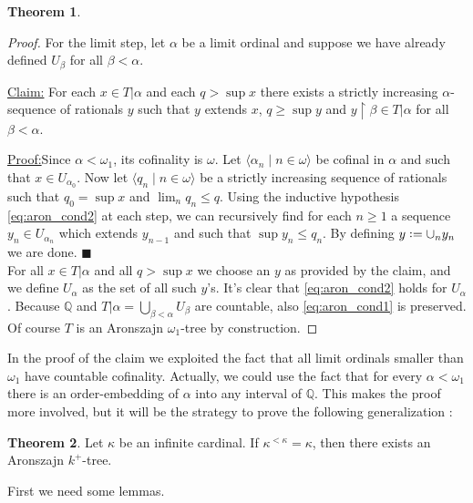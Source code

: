 \documentclass[12pt,a4paper]{report}
\theoremstyle{definition}
\newtheorem{theorem}{Theorem}[chapter] %
\theoremstyle{num.custom-title}
\newenvironment{claim}[1]{\par\noindent\underline{Claim#1:}\space}{} %
\newenvironment{claimproof}[1]{\par\noindent\underline{Proof:}\space#1}{\leavevmode\unskip\penalty9999 \hbox{}\nobreak\hfill\quad\hbox{$\blacksquare$}} %
\DeclareMathOperator{\restr}{\upharpoonright}
\newcommand{\Q}{\mathbb{Q}}
\newcommand*{\defeq}{\mathrel{\rlap{%
                     \raisebox{0.3ex}{$\cdot$}}%
                     \raisebox{-0.3ex}{$\cdot$}}%
                     =}
\begin{document}
\begin{theorem}
\begin{proof}
For the limit step, let $\alpha$ be a limit ordinal and suppose we have already defined $U_\beta$ for all $\beta<\alpha$.
\begin{claim}{}
For each $x \in T|\alpha$ and each $q > \sup x$ there exists a strictly increasing $\alpha$-sequence of rationals $y$ such that $y$ extends $x$, $q \geq \sup y$ and $y \restr \beta \in T|\alpha$ for all $\beta<\alpha$.
\begin{claimproof}
Since $\alpha < \omega_1$, its cofinality is $\omega$. Let $\langle \alpha_n \mid n \in \omega \rangle$ be cofinal in $\alpha$ and such that $x \in U_{\alpha_0}$. Now let $\langle q_n \mid n \in \omega \rangle$ be a strictly increasing sequence of rationals such that $q_0 = \sup x$ and $\lim_n q_n \leq q$. Using the inductive hypothesis \eqref{eq:aron_cond2} at each step, we can recursively find for each $n \geq 1$ a sequence $y_n \in U_{\alpha_n}$ which extends $y_{n-1}$ and such that $\sup y_n \leq q_n$. By defining $y \defeq \cup_n y_n$ we are done.
\end{claimproof}
\end{claim}\\[6pt]
For all $x \in T|\alpha$ and all $q > \sup x$ we choose an $y$ as provided by the claim, and we define $U_\alpha$ as the set of all such $y$'s. It's clear that \eqref{eq:aron_cond2} holds for $U_\alpha$. Because $\Q$ and $T|\alpha = \bigcup_{\beta < \alpha} U_\beta$ are countable, also \eqref{eq:aron_cond1} is preserved.\\
Of course $T$ is an Aronszajn $\omega_1$-tree by construction.
\end{proof}
\end{theorem}

In the proof of the claim we exploited the fact that all limit ordinals smaller than $\omega_1$ have countable cofinality. Actually, we could use the fact that for every $\alpha < \omega_1$ there is an order-embedding of $\alpha$ into any interval of $\Q$. This makes the proof more involved, but it will be the strategy to prove the following generalization \cite{Spe1951}:

\begin{theorem}\label{thm-aronszajn_k+_tree}
Let $\kappa$ be an infinite cardinal. If $\kappa^{<\kappa}=\kappa$, then there exists an Aronszajn $k^+$-tree.
\end{theorem}

First we need some lemmas.
\end{document}
